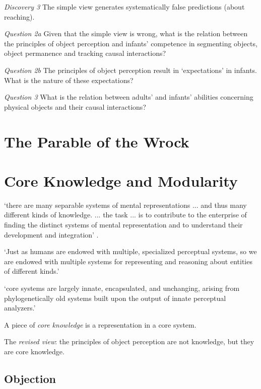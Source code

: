 \documentclass[12pt]{extarticle}
\begin{document}
\begin{multicols}{3}
\emph{Discovery 3} The simple view generates systematically false predictions (about reaching).
 
\emph{Question 2a} Given that the simple view is wrong, what is the relation between the principles of object perception and infants’ competence in segmenting objects, object permanence and tracking causal interactions?
 
\emph{Question 2b} The principles of object perception result in ‘expectations’ in infants. What is the nature of these expectations?
 
\emph{Question 3} What is the relation between adults’ and infants’ abilities concerning physical objects and their causal interactions?
 
 
 
\section{The Parable of the Wrock}
 
 
 
\section{Core Knowledge and Modularity}
 
‘there are many separable systems of mental representations ... and thus many different kinds of knowledge. ... the task ... is to contribute to the enterprise of finding the distinct systems of mental representation and to understand their development and integration’
\citep[p.\ 1522]{Hood:2000bf}.
 
‘Just as humans are endowed with multiple, specialized perceptual systems, so we are endowed with multiple systems for representing and reasoning about entities of different kinds.’
\citep[p.\ 517]{Carey:1996hl}
 
‘core systems are largely innate, encapsulated, and unchanging, arising from phylogenetically old systems built upon the output of innate perceptual analyzers.’
\citep[p.\ 520]{Carey:1996hl}
 
A piece of \emph{core knowledge} is a representation in a core system.
 
The \emph{revised view}: the principles of object perception are not knowledge, but they are core knowledge.
 
\subsection{Objection}
 

\end{multicols}
\end{document}
